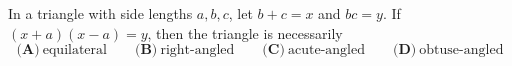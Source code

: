 In a triangle with side lengths $a,b,c$, let $b+c=x$ and $bc=y$. If $(x+a)(x-a)=y$, then the triangle is necessarily
\[
\textbf{(A)}\ \text{equilateral}\qquad\textbf{(B)}\ \text{right-angled}\qquad\textbf{(C)}\ \text{acute-angled}\qquad\textbf{(D)}\ \text{obtuse-angled}
\]
